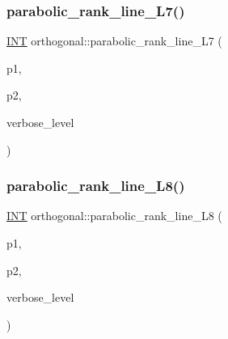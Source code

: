 \subsubsection{\texorpdfstring{parabolic\+\_\+rank\+\_\+line\+\_\+\+L7()}{parabolic\_rank\_line\_L7()}}
{\footnotesize\ttfamily \mbox{\hyperlink{galois_8h_a09fddde158a3a20bd2dcadb609de11dc}{I\+NT}} orthogonal\+::parabolic\+\_\+rank\+\_\+line\+\_\+\+L7 (\begin{DoxyParamCaption}\item[{\mbox{\hyperlink{galois_8h_a09fddde158a3a20bd2dcadb609de11dc}{I\+NT}}}]{p1,  }\item[{\mbox{\hyperlink{galois_8h_a09fddde158a3a20bd2dcadb609de11dc}{I\+NT}}}]{p2,  }\item[{\mbox{\hyperlink{galois_8h_a09fddde158a3a20bd2dcadb609de11dc}{I\+NT}}}]{verbose\+\_\+level }\end{DoxyParamCaption})}

\mbox{\label{classorthogonal_af1fb4b5a1ab65d189daea2de78de5225}} 
\subsubsection{\texorpdfstring{parabolic\+\_\+rank\+\_\+line\+\_\+\+L8()}{parabolic\_rank\_line\_L8()}}
{\footnotesize\ttfamily \mbox{\hyperlink{galois_8h_a09fddde158a3a20bd2dcadb609de11dc}{I\+NT}} orthogonal\+::parabolic\+\_\+rank\+\_\+line\+\_\+\+L8 (\begin{DoxyParamCaption}\item[{\mbox{\hyperlink{galois_8h_a09fddde158a3a20bd2dcadb609de11dc}{I\+NT}}}]{p1,  }\item[{\mbox{\hyperlink{galois_8h_a09fddde158a3a20bd2dcadb609de11dc}{I\+NT}}}]{p2,  }\item[{\mbox{\hyperlink{galois_8h_a09fddde158a3a20bd2dcadb609de11dc}{I\+NT}}}]{verbose\+\_\+level }\end{DoxyParamCaption})}

\mbox{\label{classorthogonal_a67c316cf01b382762e6ac372f522d106}} 
